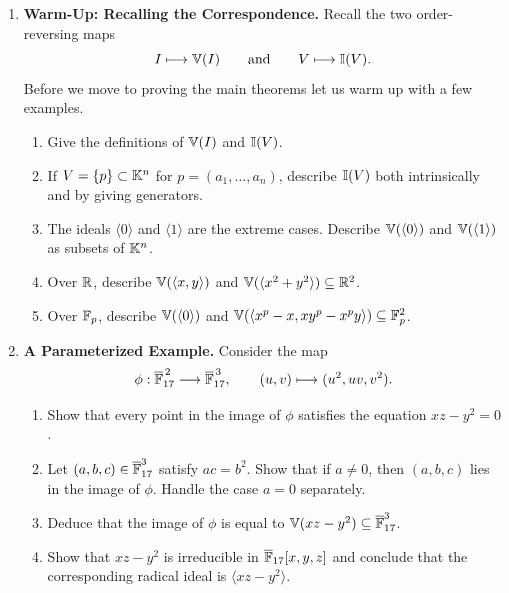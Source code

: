 \documentclass[12pt,reqno]{amsart}
\begin{document}
\hrulefill

\begin{enumerate}[leftmargin=*]

\item \textbf{Warm-Up: Recalling the Correspondence.} Recall the two order-reversing maps
\[
I \longmapsto \mathbb{V}(I)
\qquad\text{and}\qquad
V \longmapsto \mathbb{I}(V).
\]
Before we move to proving the main theorems let us warm up with a few examples.
\begin{enumerate}[label=(\alph*),ref=\theenumi\alph*]
\item Give the definitions of $\mathbb{V}(I)$ and $\mathbb{I}(V)$.
\item  If $V=\{p\} \subset \mathbb{K}^n$ for $p=(a_1,\ldots,a_n)$, describe $\mathbb{I}(V)$ both intrinsically and by giving generators.
\item The ideals $\langle 0\rangle$ and $\langle 1\rangle$ are the extreme cases. Describe $\mathbb{V}(\langle 0\rangle)$ and $\mathbb{V}(\langle 1\rangle)$ as subsets of $\mathbb{K}^n$.
\item Over $\mathbb{R}$, describe $\mathbb{V}(\langle x,y\rangle)$ and $\mathbb{V}(\langle x^2+y^2\rangle) \subseteq \mathbb{R}^2$.
\item Over $\mathbb{F}_p$, describe $\mathbb{V}(\langle 0\rangle)$ and $\mathbb{V}(\langle x^p-x,xy^p-x^py\rangle) \subseteq \mathbb{F}_p^2$.
\end{enumerate}

\item \textbf{A Parameterized Example.} Consider the map
\[
\phi:\overline{\mathbb{F}}_{17}^{\,2} \longrightarrow \overline{\mathbb{F}}_{17}^{\,3},
\qquad
(u,v) \longmapsto (u^2,uv,v^2).
\]
\begin{enumerate}[label=(\alph*),ref=\theenumi\alph*]
\item Show that every point in the image of $\phi$ satisfies the equation $xz-y^2=0$.
\item Let $(a,b,c)\in \overline{\mathbb{F}}_{17}^{3}$ satisfy $ac=b^2$. Show that if $a\neq 0$, then $(a,b,c)$ lies in the image of $\phi$. Handle the case $a=0$ separately.
\item Deduce that the image of $\phi$ is equal to $\mathbb{V}(xz-y^2)\subseteq \overline{\mathbb{F}}_{17}^{3}$.

\item Show that $xz-y^2$ is irreducible in $\overline{\mathbb{F}}_{17}[x,y,z]$ and conclude that the corresponding radical ideal is $\langle xz-y^2\rangle$.
\end{enumerate}



\end{enumerate}
\end{document}
